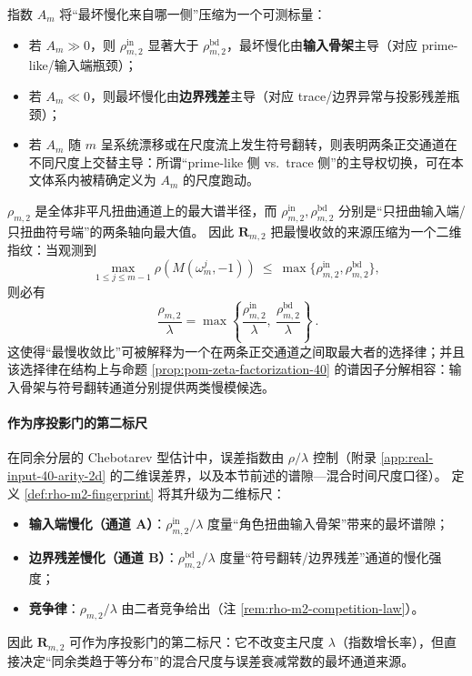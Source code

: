 \begin{remark}\label{rem:rho-m2-anisotropy-classifier}
指数 \(A_m\) 将“最坏慢化来自哪一侧”压缩为一个可测标量：
\begin{itemize}
  \item 若 \(A_m\gg 0\)，则 \(\rho^{\mathrm{in}}_{m,2}\) 显著大于 \(\rho^{\mathrm{bd}}_{m,2}\)，最坏慢化由\textbf{输入骨架}主导（对应 prime-like/输入端瓶颈）；
  \item 若 \(A_m\ll 0\)，则最坏慢化由\textbf{边界残差}主导（对应 trace/边界异常与投影残差瓶颈）；
  \item 若 \(A_m\) 随 \(m\) 呈系统漂移或在尺度流上发生符号翻转，则表明两条正交通道在不同尺度上交替主导：所谓“prime-like 侧 vs.\ trace 侧”的主导权切换，可在本文体系内被精确定义为 \(A_m\) 的尺度跑动。
\end{itemize}
\end{remark}

\begin{remark}\label{rem:rho-m2-competition-law}
\(\rho_{m,2}\) 是全体非平凡扭曲通道上的最大谱半径，而 \(\rho^{\mathrm{in}}_{m,2},\rho^{\mathrm{bd}}_{m,2}\) 分别是“只扭曲输入端/只扭曲符号端”的两条轴向最大值。
因此 \(\mathbf{R}_{m,2}\) 把最慢收敛的来源压缩为一个二维指纹：当观测到
\[
\max_{1\le j\le m-1}\rho\!\left(M(\omega_m^{j},-1)\right)\ \le\ \max\{\rho^{\mathrm{in}}_{m,2},\rho^{\mathrm{bd}}_{m,2}\},
\]
则必有
\[
\boxed{\ \frac{\rho_{m,2}}{\lambda}=\max\left\{\frac{\rho^{\mathrm{in}}_{m,2}}{\lambda},\ \frac{\rho^{\mathrm{bd}}_{m,2}}{\lambda}\right\}\ }.
\]
这使得“最慢收敛比”可被解释为一个在两条正交通道之间取最大者的选择律；并且该选择律在结构上与命题 \ref{prop:pom-zeta-factorization-40} 的谱因子分解相容：输入骨架与符号翻转通道分别提供两类慢模候选。
\end{remark}

\paragraph{作为序投影门的第二标尺}
在同余分层的 Chebotarev 型估计中，误差指数由 \(\rho/\lambda\) 控制（附录 \ref{app:real-input-40-arity-2d} 的二维误差界，以及本节前述的谱隙—混合时间尺度口径）。
定义 \ref{def:rho-m2-fingerprint} 将其升级为二维标尺：
\begin{itemize}
  \item \textbf{输入端慢化（通道 A）}：\(\rho^{\mathrm{in}}_{m,2}/\lambda\) 度量“角色扭曲输入骨架”带来的最坏谱隙；
  \item \textbf{边界残差慢化（通道 B）}：\(\rho^{\mathrm{bd}}_{m,2}/\lambda\) 度量“符号翻转/边界残差”通道的慢化强度；
  \item \textbf{竞争律}：\(\rho_{m,2}/\lambda\) 由二者竞争给出（注 \ref{rem:rho-m2-competition-law}）。
\end{itemize}
因此 \(\mathbf{R}_{m,2}\) 可作为序投影门的第二标尺：它不改变主尺度 \(\lambda\)（指数增长率），但直接决定“同余类趋于等分布”的混合尺度与误差衰减常数的最坏通道来源。


